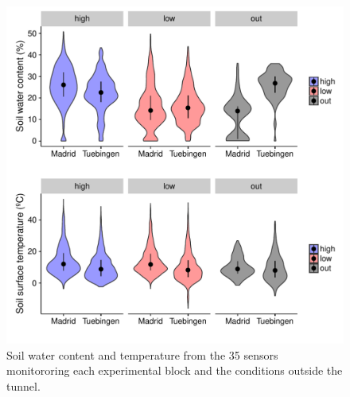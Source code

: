 \documentclass[12pt,]{article}
\begin{document}
\begin{figure}
    \centerline{\includegraphics[width=5in]{../figs/Figure_watering_temperature.pdf}}
    \caption{ Soil water content and temperature from the 35 sensors monitororing each experimental block and the conditions outside the tunnel.}
    \label{fig:histoenv}
\end{figure}
\end{document}
